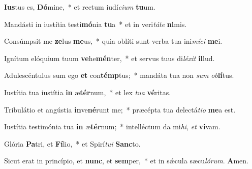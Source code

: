 \item \textbf{Ius}tus es, \textbf{Dó}mine,~* et rectum iudí\textit{cium} \textbf{tu}um.

\item Mandásti in iustítia testi\textbf{mó}nia \textbf{tu}a~* et in veri\textit{táte} \textbf{ni}mis.

\item Consúmpsit me \textbf{ze}lus \textbf{me}us,~* quia oblíti sunt verba tua ini\textit{míci} \textbf{me}i.

\item Ignítum elóquium tuum \textbf{ve}he\textbf{mén}ter,~* et servus tuus di\textit{léxit} \textbf{il}lud.

\item Adulescéntulus sum ego \textbf{et} con\textbf{témp}tus;~* mandáta tua non \textit{sum} \textit{ob}\textbf{lí}tus.

\item Iustítia tua iustítia \textbf{in} æ\textbf{tér}num,~* et lex \textit{tua} \textbf{vé}ritas.

\item Tribulátio et angústia \textbf{in}ve\textbf{né}runt me;~* præcépta tua delectá\textit{tio} \textbf{me}a est.

\item Iustítia testimónia tua \textbf{in} æ\textbf{tér}num;~* intelléctum da mi\textit{hi}, \textit{et} \textbf{vi}vam.

\item Glória \textbf{Pa}tri, et \textbf{Fí}lio,~* et Spirí\textit{tui} \textbf{Sanc}to.

\item Sicut erat in princípio, et \textbf{nunc}, et \textbf{sem}per,~* et in sǽcula sæcu\textit{lórum}. \textbf{A}men.